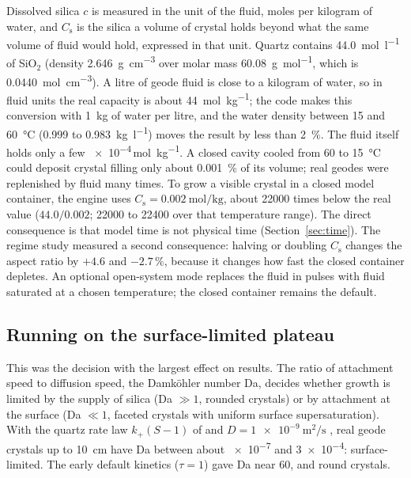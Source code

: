 \documentclass[11pt,a4paper]{article}
\begin{document}
Dissolved silica $c$ is measured in the unit of the fluid, moles per kilogram of water, and $C_\mathrm{s}$ is the silica a volume of crystal holds beyond what the same volume of fluid would hold, expressed in that unit. Quartz contains \SI{44.0}{\mole\per\litre} of SiO$_2$ (density \SI{2.646}{\gram\per\centi\metre\cubed} over molar mass \SI{60.08}{\gram\per\mole}, which is \SI{0.0440}{\mole\per\centi\metre\cubed}). A litre of geode fluid is close to a kilogram of water, so in fluid units the real capacity is about \SI{44}{\mole\per\kilo\gram}; the code makes this conversion with \SI{1}{\kilo\gram} of water per litre, and the water density between \SI{15}{} and \SI{60}{\celsius} (0.999 to \SI{0.983}{\kilo\gram\per\litre}) moves the result by less than \SI{2}{\percent}. The fluid itself holds only a few \num{e-4}\,\si{\mole\per\kilo\gram}. A closed cavity cooled from \SI{60}{} to \SI{15}{\celsius} could deposit crystal filling only about \SI{0.001}{\percent} of its volume; real geodes were replenished by fluid many times. To grow a visible crystal in a closed model container, the engine uses $C_\mathrm{s}=\SI{0.002}{\mole\per\kilo\gram}$, about \num{22000} times below the real value ($44.0/0.002$; \num{22000} to \num{22400} over that temperature range). The direct consequence is that model time is not physical time (Section~\ref{sec:time}). The regime study measured a second consequence: halving or doubling $C_\mathrm{s}$ changes the aspect ratio by $+4.6$ and $-2.7\,\%$, because it changes how fast the closed container depletes. An optional open-system mode replaces the fluid in pulses with fluid saturated at a chosen temperature; the closed container remains the default.

\subsection{Running on the surface-limited plateau}\label{sec:regime}

This was the decision with the largest effect on results. The ratio of attachment speed to diffusion speed, the Damköhler number Da, decides whether growth is limited by the supply of silica (Da $\gg1$, rounded crystals) or by attachment at the surface (Da $\ll1$, faceted crystals with uniform surface supersaturation). With the quartz rate law $k_+(S-1)$ of \citet{Takeno2000} and $D=\SI{1e-9}{\metre\squared\per\second}$ \citep{Rebreanu2008}, real geode crystals up to \SI{10}{\centi\metre} have Da between about \num{e-7} and \num{3e-4}: surface-limited. The early default kinetics ($\tau=1$) gave Da near 60, and round crystals.
\end{document}
